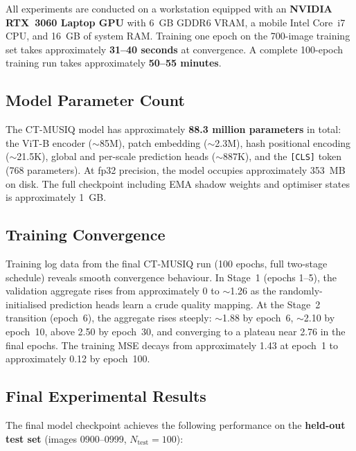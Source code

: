 All experiments are conducted on a workstation equipped with an \textbf{NVIDIA RTX~3060
Laptop GPU} with 6~GB GDDR6 VRAM, a mobile Intel Core~i7 CPU, and 16~GB of system RAM.
Training one epoch on the 700-image training set takes approximately \textbf{31--40
seconds} at convergence. A complete 100-epoch training run takes approximately
\textbf{50--55 minutes}.

\subsection{Model Parameter Count}

The CT-MUSIQ model has approximately \textbf{88.3 million parameters} in total:
the ViT-B encoder ($\sim$85M), patch embedding ($\sim$2.3M), hash positional encoding
($\sim$21.5K), global and per-scale prediction heads ($\sim$887K), and the
\texttt{[CLS]} token (768 parameters). At fp32 precision, the model occupies
approximately 353~MB on disk. The full checkpoint including EMA shadow weights and
optimiser states is approximately 1~GB.

\subsection{Training Convergence}

Training log data from the final CT-MUSIQ run (100 epochs, full two-stage schedule)
reveals smooth convergence behaviour. In Stage~1 (epochs 1--5), the validation aggregate
rises from approximately 0 to $\sim$1.26 as the randomly-initialised prediction heads
learn a crude quality mapping. At the Stage~2 transition (epoch~6), the aggregate rises
steeply: $\sim$1.88 by epoch~6, $\sim$2.10 by epoch~10, above 2.50 by epoch~30, and
converging to a plateau near 2.76 in the final epochs. The training MSE decays from
approximately 1.43 at epoch~1 to approximately 0.12 by epoch~100.

\subsection{Final Experimental Results}

The final model checkpoint achieves the following performance on the \textbf{held-out
test set} (images 0900--0999, $N_{\text{test}} = 100$):


